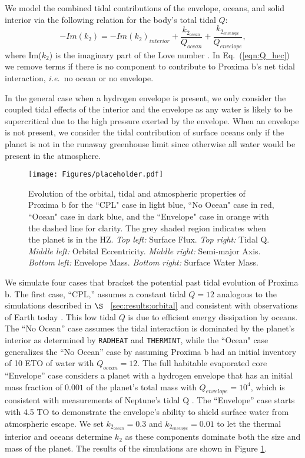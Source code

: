 \documentclass[preprint,12pt]{aastex}
\def\ie{{\it i.e.\ }}
\def\radheat{\texttt{\footnotesize{RADHEAT}}\xspace}
\def\thermint{\texttt{\footnotesize{THERMINT}}\xspace}
\begin{document}
We model the combined tidal contributions of the envelope, oceans, and
solid interior via the following relation for the body's total tidal
$Q$:
\begin{equation}
\label{eqn:Q_hec}
-Im(k_2) = -Im(k_2)_{interior} + \frac{ k_{2_{ocean}}}{Q_{ocean}} +  %
\frac{ k_{2_{envelope}}}{Q_{envelope}},
\end{equation}
where Im($k_2$) is the imaginary part of the Love number \citep[see][]{DriscollBarnes15}. In Eq.~(\ref{eqn:Q_hec}) we remove terms if there is no 
component to contribute to Proxima b's net tidal interaction, \ie no ocean or no envelope.  

In the general case when a hydrogen envelope is present, we only
consider the coupled tidal effects of the interior and the envelope as any
water is likely to be supercritical due to the high pressure exerted
by the envelope.  When an envelope is not present,
we consider the tidal contribution of surface oceans only if the planet is
not in the runaway greenhouse limit since otherwise all water would be present
in the atmosphere.

\begin{figure} 
\centering
\texttt{[image: Figures/placeholder.pdf]}
\caption{Evolution of the orbital, tidal and atmospheric properties of
  Proxima b for the ``CPL" case in light blue, ``No Ocean" case in
  red, ``Ocean" case in dark blue, and the ``Envelope" case in orange
  with the dashed line for clarity.  The grey shaded region indicates
  when the planet is in the HZ. {\it Top left:} Surface Flux. {\it Top
    right:} Tidal Q. {\it Middle left:} Orbital Eccentricity. {\it
    Middle right:} Semi-major Axis. {\it Bottom left:} Envelope
  Mass. {\it Bottom right:} Surface Water Mass.}
\label{fig:tidal_hec}
\end{figure}

We simulate four cases that bracket the potential
past tidal evolution of Proxima b.  The first case, ``CPL,'' assumes a
constant tidal $Q = 12$ analogous to the simulations described in
$\S$~ \ref{sec:results:orbital} and consistent with observations of
Earth today \citep{Dickey94,Williams78,Yoder95}.  This low tidal $Q$
is due to efficient energy dissipation by oceans.  The ``No Ocean''
case assumes the tidal interaction is dominated by the planet's
interior as determined by \radheat and \thermint, while the ``Ocean"
case generalizes the ``No Ocean'' case by assuming Proxima b had an
initial inventory of 10 ETO of water with $Q_{ocean} = 12$.  The full
habitable evaporated core ``Envelope'' case considers a planet with a
hydrogen envelope that has an initial mass fraction of $0.001$ of the
planet's total mass with $Q_{envelope} = 10^4$, which is consistent
with measurements of Neptune's tidal Q \citep{ZhangHamilton08}.  The
``Envelope'' case starts with 4.5 TO to demonstrate the envelope's
ability to shield surface water from atmospheric escape.  We set
$k_{2_{ocean}} = 0.3$ and $k_{2_{envelope}} = 0.01$ to let the thermal
interior and oceans determine $k_2$ as these components dominate both
the size and mass of the planet. The results of the simulations are
shown in Figure \ref{fig:tidal_hec}.
\end{document}
